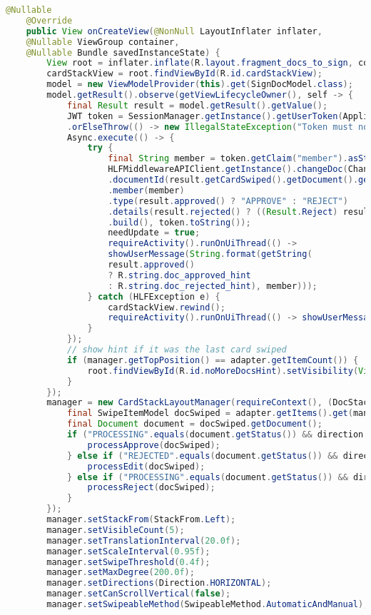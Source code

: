 \begin{lstlisting}[language=Java]
	@Nullable
	@Override
	public View onCreateView(@NonNull LayoutInflater inflater,
	@Nullable ViewGroup container,
	@Nullable Bundle savedInstanceState) {
		View root = inflater.inflate(R.layout.fragment_docs_to_sign, container, false);
		cardStackView = root.findViewById(R.id.cardStackView);
		model = new ViewModelProvider(this).get(SignDocModel.class);
		model.getResult().observe(getViewLifecycleOwner(), self -> {
			final Result result = model.getResult().getValue();
			JWT token = SessionManager.getInstance().getUserToken(ApplicationContext.get())
			.orElseThrow(() -> new IllegalStateException("Token must not be null at this stage."));
			Async.execute(() -> {
				try {
					final String member = token.getClaim("member").asString();
					HLFMiddlewareAPIClient.getInstance().changeDoc(ChangeDocRequest.builder()
					.documentId(result.getCardSwiped().getDocument().getDocumentId())
					.member(member)
					.type(result.approved() ? "APPROVE" : "REJECT")
					.details(result.rejected() ? ((Result.Reject) result).getReason() : null)
					.build(), token.toString());
					needUpdate = true;
					requireActivity().runOnUiThread(() ->
					showUserMessage(String.format(getString(
					result.approved()
					? R.string.doc_approved_hint
					: R.string.doc_rejected_hint), member)));
				} catch (HLFException e) {
					cardStackView.rewind();
					requireActivity().runOnUiThread(() -> showUserMessage(R.string.unexpected_error));
				}
			});
			// show hint if it was the last card swiped
			if (manager.getTopPosition() == adapter.getItemCount()) {
				root.findViewById(R.id.noMoreDocsHint).setVisibility(View.VISIBLE);
			}
		});
		manager = new CardStackLayoutManager(requireContext(), (DocStackListener) direction -> {
			final SwipeItemModel docSwiped = adapter.getItems().get(manager.getTopPosition() - 1);
			final Document document = docSwiped.getDocument();
			if ("PROCESSING".equals(document.getStatus()) && direction == Direction.Right) {
				processApprove(docSwiped);
			} else if ("REJECTED".equals(document.getStatus()) && direction == Direction.Right) {
				processEdit(docSwiped);
			} else if ("PROCESSING".equals(document.getStatus()) && direction == Direction.Left) {
				processReject(docSwiped);
			}
		});
		manager.setStackFrom(StackFrom.Left);
		manager.setVisibleCount(5);
		manager.setTranslationInterval(20.0f);
		manager.setScaleInterval(0.95f);
		manager.setSwipeThreshold(0.4f);
		manager.setMaxDegree(200.0f);
		manager.setDirections(Direction.HORIZONTAL);
		manager.setCanScrollVertical(false);
		manager.setSwipeableMethod(SwipeableMethod.AutomaticAndManual);

\end{lstlisting}
